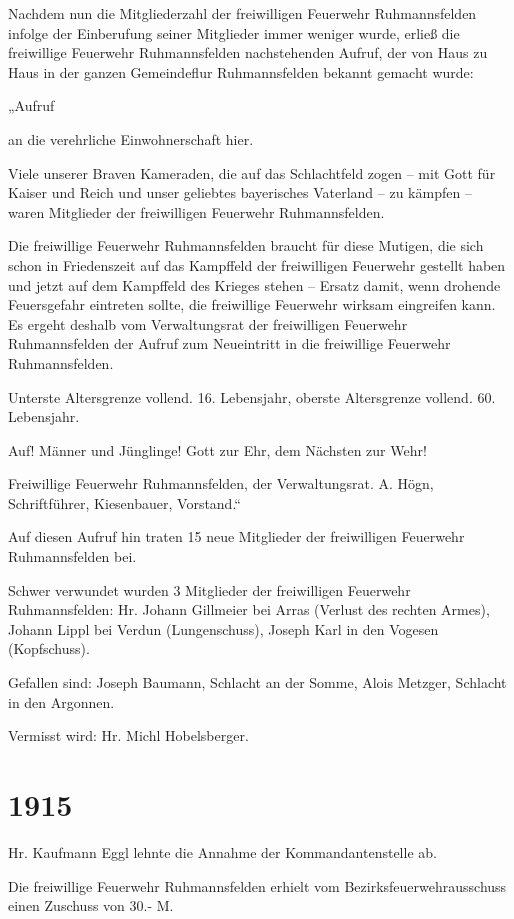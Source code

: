 \documentclass[12pt,a4paper]{book}
\begin{document}
Nachdem nun die Mitgliederzahl der freiwilligen Feuerwehr Ruhmannsfelden infolge
der Einberufung seiner Mitglieder immer weniger wurde, erließ die freiwillige
Feuerwehr Ruhmannsfelden nachstehenden Aufruf, der von Haus zu Haus in der
ganzen Gemeindeflur Ruhmannsfelden bekannt gemacht wurde:

„Aufruf

an die verehrliche Einwohnerschaft hier.

Viele unserer Braven Kameraden, die auf das Schlachtfeld zogen – mit Gott für
Kaiser und Reich und unser geliebtes bayerisches Vaterland – zu kämpfen – waren
Mitglieder der freiwilligen Feuerwehr Ruhmannsfelden.

Die freiwillige Feuerwehr Ruhmannsfelden braucht für diese Mutigen, die sich
schon in Friedenszeit auf das Kampffeld der freiwilligen Feuerwehr gestellt
haben und jetzt auf dem Kampffeld des Krieges stehen – Ersatz damit, wenn
drohende Feuersgefahr eintreten sollte, die freiwillige Feuerwehr wirksam
eingreifen kann. Es ergeht deshalb vom Verwaltungsrat der freiwilligen Feuerwehr
Ruhmannsfelden der Aufruf zum Neueintritt in die freiwillige Feuerwehr
Ruhmannsfelden.

Unterste Altersgrenze vollend. 16. Lebensjahr, oberste Altersgrenze vollend. 60.
Lebensjahr.

Auf! Männer und Jünglinge! Gott zur Ehr, dem Nächsten zur Wehr!

Freiwillige Feuerwehr Ruhmannsfelden, der Verwaltungsrat. A. Högn,
Schriftführer, Kiesenbauer, Vorstand.“

Auf diesen Aufruf hin traten 15 neue Mitglieder der freiwilligen Feuerwehr
Ruhmannsfelden bei.

Schwer verwundet wurden 3 Mitglieder der freiwilligen Feuerwehr Ruhmannsfelden:
Hr. Johann Gillmeier bei Arras (Verlust des rechten Armes), Johann Lippl bei
Verdun (Lungenschuss), Joseph Karl in den Vogesen (Kopfschuss).

Gefallen sind: Joseph Baumann, Schlacht an der Somme, Alois Metzger, Schlacht in
den Argonnen.

Vermisst wird: Hr. Michl Hobelsberger.

\section*{1915}

Hr. Kaufmann Eggl lehnte die Annahme der Kommandantenstelle ab.

Die freiwillige Feuerwehr Ruhmannsfelden erhielt vom Bezirksfeuerwehrausschuss
einen Zuschuss von 30.- M.
\end{document}
